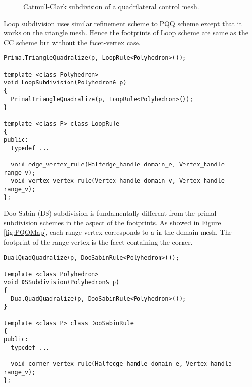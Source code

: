 
\begin{figure}[htb]
    \caption{Catmull-Clark subdivision of a quadrilateral control mesh.}  
    \label{fig:cc}
\end{figure}

Loop subdivision uses similar refinement scheme to PQQ scheme except
that it works on the triangle mesh. Hence the footprints of Loop
scheme are same as the CC scheme but without the facet-vertex case.

{\scriptsize
\begin{verbatim}
PrimalTriangleQuadralize(p, LoopRule<Polyhedron>());

template <class Polyhedron>
void LoopSubdivision(Polyhedron& p) 
{ 
  PrimalTriangleQuadralize(p, LoopRule<Polyhedron>());
}

template <class P> class LoopRule 
{
public:
  typedef ...

  void edge_vertex_rule(Halfedge_handle domain_e, Vertex_handle range_v);
  void vertex_vertex_rule(Vertex_handle domain_v, Vertex_handle range_v);
};
\end{verbatim}
}

Doo-Sabin (DS) subdivision is fundamentally different from the primal
subdivision schemes in the aspect of the footprints. As showed in
Figure \ref{fig:PQQMap}, each range vertex corresponds to a
 in the domain mesh. The footprint of the range vertex
is the facet containing the corner.



{\scriptsize
\begin{verbatim}
DualQuadQuadralize(p, DooSabinRule<Polyhedron>());

template <class Polyhedron>
void DSSubdivision(Polyhedron& p) 
{ 
  DualQuadQuadralize(p, DooSabinRule<Polyhedron>());
}

template <class P> class DooSabinRule 
{
public:
  typedef ...

  void corner_vertex_rule(Halfedge_handle domain_e, Vertex_handle range_v);
};
\end{verbatim}
}

